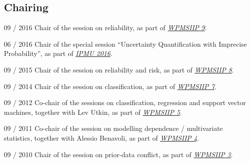 \documentclass[a4paper]{simplecv}
\begin{document}
\subsection{Chairing}

\begin{topic}
\item[09 / 2016] Chair of the session on reliability,
                 as part of \emph{\href{http://www.maths.dur.ac.uk/users/matthias.troffaes/wpmsiip2016/index.html}{WPMSIIP 9}}.

\item[06 / 2016] Chair of the special session ``Uncertainty Quantification with Imprecise Probability'',
                 as part of \emph{\href{http://www.ipmu2016.org}{IPMU 2016}}.

\item[09 / 2015] Chair of the session on reliability and risk,
                 as part of \emph{\href{http://www.statistik.lmu.de/wpmsiip_2015/}{WPMSIIP 8}}.

\item[09 / 2014] Chair of the session on classification,
                 as part of \emph{\href{http://users.ugent.be/~slopatat/wpmsiip2014/index.html}{WPMSIIP 7}}.

\item[09 / 2012] Co-chair of the sessions on classification, regression and support vector machines, together with Lev Utkin,
                 as part of \emph{\href{http://www.statistik.lmu.de/institut/ag/statsoz_neu/research/WPMSIIP_2012/}{WPMSIIP 5}}.

\item[09 / 2011] Co-chair of the session on modelling dependence / multivariate statistics, together with Alessio Benavoli,
                 as part of \emph{\href{http://wpmsiip2011.fdvinfo.net/c/646/Information/}{WPMSIIP 4}}.

\item[09 / 2010] Chair of the session on prior-data conflict,
                 as part of \emph{\href{http://www.maths.dur.ac.uk/users/matthias.troffaes/wpmsiip2010/}{WPMSIIP 3}}.


\end{topic}
\end{document}
